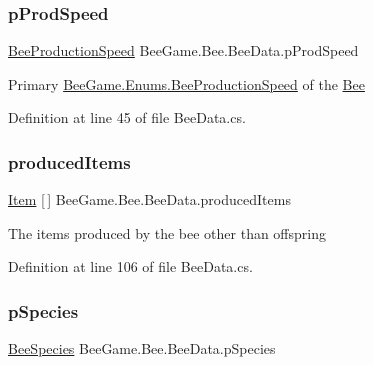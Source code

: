 \subsubsection{\texorpdfstring{p\+Prod\+Speed}{pProdSpeed}}
{\footnotesize\ttfamily \hyperlink{namespace_bee_game_1_1_enums_afee18200a21cc4b8e1d0cdb669930f14}{Bee\+Production\+Speed} Bee\+Game.\+Bee.\+Bee\+Data.\+p\+Prod\+Speed}



Primary \hyperlink{namespace_bee_game_1_1_enums_afee18200a21cc4b8e1d0cdb669930f14}{Bee\+Game.\+Enums.\+Bee\+Production\+Speed} of the \hyperlink{namespace_bee_game_1_1_bee}{Bee} 



Definition at line 45 of file Bee\+Data.\+cs.

\mbox{\label{struct_bee_game_1_1_bee_1_1_bee_data_a3c49396295407e1744f501e86c32d61c}} 
\subsubsection{\texorpdfstring{produced\+Items}{producedItems}}
{\footnotesize\ttfamily \hyperlink{struct_bee_game_1_1_items_1_1_item}{Item} \mbox{[}$\,$\mbox{]} Bee\+Game.\+Bee.\+Bee\+Data.\+produced\+Items}



The items produced by the bee other than offspring 



Definition at line 106 of file Bee\+Data.\+cs.

\mbox{\label{struct_bee_game_1_1_bee_1_1_bee_data_a87db9add2bcc463ab444eb4ac7a4e228}} 
\subsubsection{\texorpdfstring{p\+Species}{pSpecies}}
{\footnotesize\ttfamily \hyperlink{namespace_bee_game_1_1_enums_aa2ead984825678d83c42d48f6382619c}{Bee\+Species} Bee\+Game.\+Bee.\+Bee\+Data.\+p\+Species}



